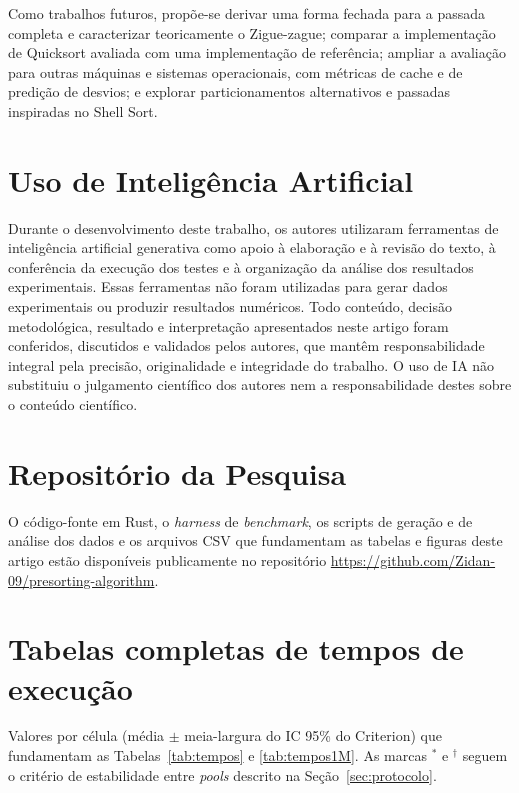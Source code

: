 \documentclass[12pt]{article}
\begin{document}
Como trabalhos futuros, propõe-se derivar uma forma fechada para a passada completa e caracterizar teoricamente o Zigue-zague; comparar a implementação de Quicksort avaliada com uma implementação de referência; ampliar a avaliação para outras máquinas e sistemas operacionais, com métricas de cache e de predição de desvios; e explorar particionamentos alternativos e passadas inspiradas no Shell Sort.

\section{Uso de Inteligência Artificial}\label{sec:ia}

Durante o desenvolvimento deste trabalho, os autores utilizaram ferramentas de inteligência artificial generativa como apoio à elaboração e à revisão do texto, à conferência da execução dos testes e à organização da análise dos resultados experimentais. Essas ferramentas não foram utilizadas para gerar dados experimentais ou produzir resultados numéricos. Todo conteúdo, decisão metodológica, resultado e interpretação apresentados neste artigo foram conferidos, discutidos e validados pelos autores, que mantêm responsabilidade integral pela precisão, originalidade e integridade do trabalho. O uso de IA não substituiu o julgamento científico dos autores nem a responsabilidade destes sobre o conteúdo científico.

\section{Repositório da Pesquisa}\label{sec:repositorio}

O código-fonte em Rust, o \emph{harness} de \emph{benchmark}, os scripts de geração e de análise dos dados e os arquivos CSV que fundamentam as tabelas e figuras deste artigo estão disponíveis publicamente no repositório \url{https://github.com/Zidan-09/presorting-algorithm}.

\appendix
\section{Tabelas completas de tempos de execução}
\label{sec:aptabelas}

Valores por célula (média $\pm$ meia-largura do IC 95\% do Criterion) que fundamentam as Tabelas~\ref{tab:tempos} e \ref{tab:tempos1M}. As marcas $^{*}$ e $^{\dagger}$ seguem o critério de estabilidade entre \emph{pools} descrito na Seção~\ref{sec:protocolo}.
\end{document}
